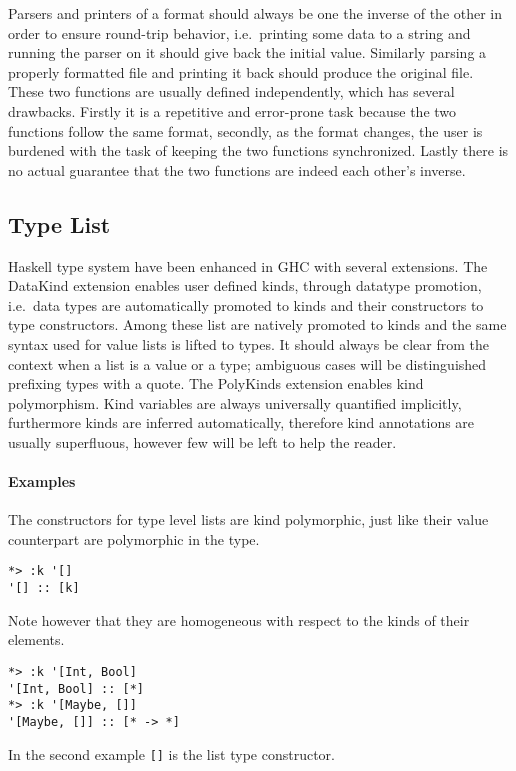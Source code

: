 \documentclass[../Thesis.tex]{subfiles}
\begin{document}
Parsers and printers of a format should always be one the inverse of the other in order to ensure round-trip behavior, i.e.\ printing some data to a string
and running the parser on it should give back the initial value. Similarly parsing a properly formatted file and printing it back should produce the original file.
These two functions are usually defined independently, which has several drawbacks. Firstly it is a repetitive and error-prone task because the two functions follow the same format, secondly, as the format changes, the user is burdened with the task of keeping the two functions synchronized. Lastly there is no actual guarantee that the two functions are indeed each other's inverse.

	\subsection{Type List}
	\label{subsec:TypeList}
	Haskell type system have been enhanced in GHC with
	several extensions. The DataKind extension enables
	user defined kinds, through datatype promotion, i.e.\
	data types are automatically promoted to kinds and
	their constructors to type constructors.
	Among these list are natively promoted to kinds
	and the same syntax used for value lists is lifted
	to types. It should always be clear from the context
	when a list is a value or a type; ambiguous cases
	will be distinguished prefixing types with a quote.
	The PolyKinds extension enables kind polymorphism.
	Kind variables are always universally quantified implicitly,
	furthermore kinds are inferred automatically,
	therefore kind annotations are usually superfluous, 
	however few will be left to help the reader.
	
	\paragraph{Examples}
	The constructors for type level lists are kind polymorphic,
	just like their value counterpart are polymorphic in the type.
\begin{verbatim}
*> :k '[]
'[] :: [k]
\end{verbatim}

	Note however that they are homogeneous with respect to the kinds of 
	their elements.
\begin{verbatim}
*> :k '[Int, Bool]
'[Int, Bool] :: [*]
*> :k '[Maybe, []]
'[Maybe, []] :: [* -> *]
\end{verbatim}
	In the second example \texttt{[]} is the list type constructor.
	
\end{document}
